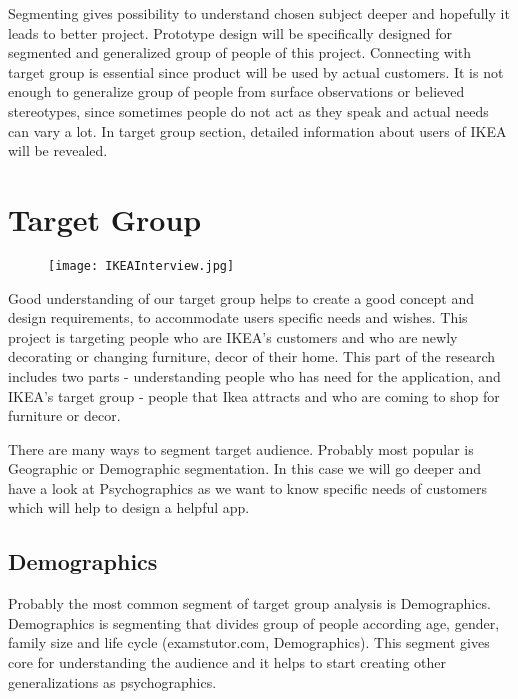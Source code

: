 Segmenting gives possibility to understand chosen subject deeper and hopefully it leads to better project. Prototype design will be specifically designed for segmented and generalized group of people of this project. 
Connecting with target group is essential since product will be used by actual customers. It is not enough to generalize group of people from surface observations or believed stereotypes, since sometimes people do not act as they speak and actual needs can vary a lot. In target group section, detailed information about users of IKEA will be revealed.

\section{Target Group}
\begin{figure}[H]
\centering
\texttt{[image: IKEAInterview.jpg]}
\end{figure}
Good understanding of our target group helps to create a good concept and design requirements, to accommodate users specific needs and  wishes. 
This project is targeting people who are IKEA's customers and who are newly decorating or changing furniture, decor  of their home. This part of the research includes two parts - understanding people who has need for the application, and IKEA's target group - people that Ikea attracts  and who are coming to shop for furniture or decor.

There are many ways to segment target audience. Probably most popular is Geographic or Demographic segmentation. In this case we will go deeper and have a look at Psychographics as we want to know specific needs of customers which will help to design a helpful app. 
\subsection{Demographics }
Probably the most common segment of target group analysis is Demographics. Demographics is segmenting that divides group of people according age, gender, family size and life cycle (examstutor.com, Demographics). This segment gives core for understanding the audience and it helps to start creating other generalizations as psychographics.

